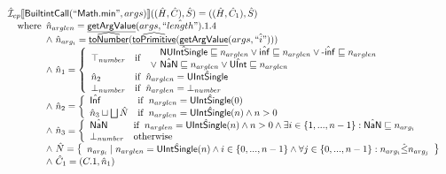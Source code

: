 \documentclass{article}
\newcommand{\SF}[1]{\mbox{\textsf{#1}}}
\newcommand{\wherec}[1]{{\rm where}\begin{array}[t]{l}#1\end{array}}
\newcommand{\ifc}[1]{{\rm if}\begin{array}[t]{l}#1\end{array}}
\newcommand{\owc}{{\rm otherwise}}
\newcommand{\aI}{\hat{\mathcal{I}}}
\newcommand{\set}[1]{\left\{\begin{array}{l}#1\end{array}\right\}}
\newcommand{\lbr}{\llbracket}
\newcommand{\rbr}{\rrbracket}
\newcommand{\hf}[1]{\underline{\sf #1}}
\newcommand{\ahf}[1]{\widehat{\underline{\sf #1}}}
\begin{document}
\[\begin{array}{ll}
\aI _{cp}\lbr \SF{BuiltintCall}(``\SF{Math.min}",args)\rbr((\hat{H},\hat{C}), \hat{S})
  = ((\hat{H}, \hat{C}_1), \hat{S})\\
\quad\wherec{
  \hat{n}_{arglen} = \hf{getArgValue}(args, \hat{``length"}).1.4\\
  \land\ \hat{n}_{arg_i} = \ahf{toNumber}(\ahf{toPrimitive}(\hf{getArgValue}(args, \hat{``i"})))\\
  \land\ \hat{n}_1 = \left\{\begin{array}{ll}
      \top_{number} & \ifc{\begin{array}{l}
          \quad \hat{\SF{NUIntSingle}} \sqsubseteq n_{arglen} \lor \hat{\SF{inf}} \sqsubseteq n_{arglen}        
          \lor \hat{\SF{-inf}} \sqsubseteq n_{arglen}\\
          \lor\ \hat{\SF{NaN}} \sqsubseteq n_{arglen} \lor \hat{\SF{UInt}} \sqsubseteq n_{arglen}
        \end{array}}\\
      \hat{n}_2 & \ifc{\hat{n}_{arglen} = \hat{\SF{UIntSingle}}}\\
      \bot_{number} &  \ifc{\hat{n}_{arglen} = \bot_{number}}\\
    \end{array}\right.\\
  \land\ \hat{n}_2 = \left\{\begin{array}{ll}
      \hat{\SF{Inf}} & \ifc{n_{arglen} = \hat{\SF{UIntSingle}}(0)}\\
      \hat{n}_3 \sqcup \bigsqcup \hat{N}& \ifc{n_{arglen} = \hat{\SF{UIntSingle}}(n) \land n > 0}\\
    \end{array}\right.\\
  \land\ \hat{n}_3 = \left\{\begin{array}{ll}
      \hat{\SF{NaN}}
      & \ifc{n_{arglen} = \hat{\SF{UIntSingle}}(n)
        \land n > 0 \land \exists i \in \{1,..., n-1\}: \hat{\SF{NaN}} \sqsubseteq {n}_{arg_i}}\\
      \bot_{number} & \owc
    \end{array}\right.\\
  \land\ \hat{N} = \set{{n}_{arg_i} \mid n_{arglen} = \hat{\SF{UIntSingle}}(n)
    \land i \in \{0,...,n-1\} \land \forall j \in \{0,...,n-1\}: {n}_{arg_i} \hat{\leq} {n}_{arg_j}}\\
  \land\ \hat{C}_1 = (C.1, \hat{n}_1)
  }\\
\\\\

\end{array}
\]
\end{document}
